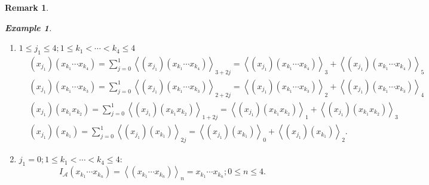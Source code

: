 \documentclass[aps,preprint]{revtex4}%
\newtheorem{example}[theorem]{Example}
\newtheorem{remark}[theorem]{Remark}
\begin{document}
\begin{remark}
\begin{example}
\begin{enumerate}
\begin{enumerate}
\item $1\leq j_{1}\leq4;1\leq k_{1}<\cdots<k_{4}\leq4$%
\begin{align*}
&  \left(  x_{j_{1}}\right)  \left(  x_{k_{1}}\cdots x_{k_{4}}\right)
=\sum_{j=0}^{1}\left\langle \left(  x_{j_{1}}\right)  \left(  x_{k_{1}}\cdots
x_{k_{4}}\right)  \right\rangle _{3+2j}=\left\langle \left(  x_{j_{1}}\right)
\left(  x_{k_{1}}\cdots x_{k_{4}}\right)  \right\rangle _{3}+\left\langle
\left(  x_{j_{1}}\right)  \left(  x_{k_{1}}\cdots x_{k_{4}}\right)
\right\rangle _{5}\\
&  \left(  x_{j_{1}}\right)  \left(  x_{k_{1}}\cdots x_{k_{3}}\right)
=\sum_{j=0}^{1}\left\langle \left(  x_{j_{1}}\right)  \left(  x_{k_{1}}\cdots
x_{k_{3}}\right)  \right\rangle _{2+2j}=\left\langle \left(  x_{j_{1}}\right)
\left(  x_{k_{1}}\cdots x_{k_{3}}\right)  \right\rangle _{2}+\left\langle
\left(  x_{j_{1}}\right)  \left(  x_{k_{1}}\cdots x_{k_{3}}\right)
\right\rangle _{4}\\
&  \left(  x_{j_{1}}\right)  \left(  x_{k_{1}}x_{k_{2}}\right)  =\sum
_{j=0}^{1}\left\langle \left(  x_{j_{1}}\right)  \left(  x_{k_{1}}x_{k_{2}%
}\right)  \right\rangle _{1+2j}=\left\langle \left(  x_{j_{1}}\right)  \left(
x_{k_{1}}x_{k_{2}}\right)  \right\rangle _{1}+\left\langle \left(  x_{j_{1}%
}\right)  \left(  x_{k_{1}}x_{k_{2}}\right)  \right\rangle _{3}\\
&  \left(  x_{j_{1}}\right)  \left(  x_{k_{1}}\right)  =\sum_{j=0}%
^{1}\left\langle \left(  x_{j_{1}}\right)  \left(  x_{k_{1}}\right)
\right\rangle _{2j}=\left\langle \left(  x_{j_{1}}\right)  \left(  x_{k_{1}%
}\right)  \right\rangle _{0}+\left\langle \left(  x_{j_{1}}\right)  \left(
x_{k_{1}}\right)  \right\rangle _{2}.
\end{align*}


\item $j_{1}=0;1\leq k_{1}<\cdots<k_{4}\leq4:$%
\begin{equation}
I_{\mathcal{A}}\left(  x_{k_{1}}\cdots x_{k_{n}}\right)  =\left\langle \left(
x_{k_{1}}\cdots x_{k_{n}}\right)  \right\rangle _{n}=x_{k_{1}}\cdots x_{k_{n}%
};0\leq n\leq4.
\end{equation}



\end{enumerate}
\end{enumerate}
\end{example}
\end{remark}
\end{document}

